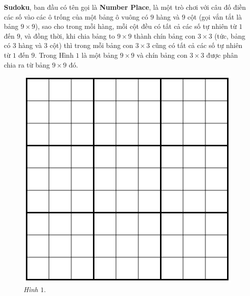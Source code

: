 \newpage
\graphicspath{{../suyluancungbi/sudoku1/}}
\begingroup
{} %
\centering
\endgroup
\vspace*{80pt}

	\begin{multicols}{2}
		\textbf{Sudoku}, ban đầu có tên gọi là \textbf{Number Place}, là một trò chơi với câu đố điền các số vào các ô trống của một bảng ô vuông có $9$ hàng và $9$ cột (gọi vắn tắt là bảng $9\times 9$), sao cho trong mỗi hàng, mỗi cột đều có tất cả các số tự nhiên từ $1$ đến $9$, và đồng thời, khi chia bảng to $9\times9$ thành chín bảng con $3\times 3$ (tức, bảng có $3$ hàng và $3$ cột) thì trong mỗi bảng con $3\times 3$ cũng có tất cả các số tự nhiên từ $1$ đến $9$. Trong Hình $1$ là một bảng $9\times 9$ và chín bảng con $3\times 3$ được phân chia ra từ bảng $9\times 9$ đó.
		\begin{figure}[H]
			\vspace*{-5pt}
			\centering
			\captionsetup{labelformat=empty, justification=centering}
			\includegraphics[scale=0.35]{hinh1}
			\caption{\textit{\small Hình $1.$}}
			\vspace*{-5pt}
		\end{figure}
	\end{multicols}
